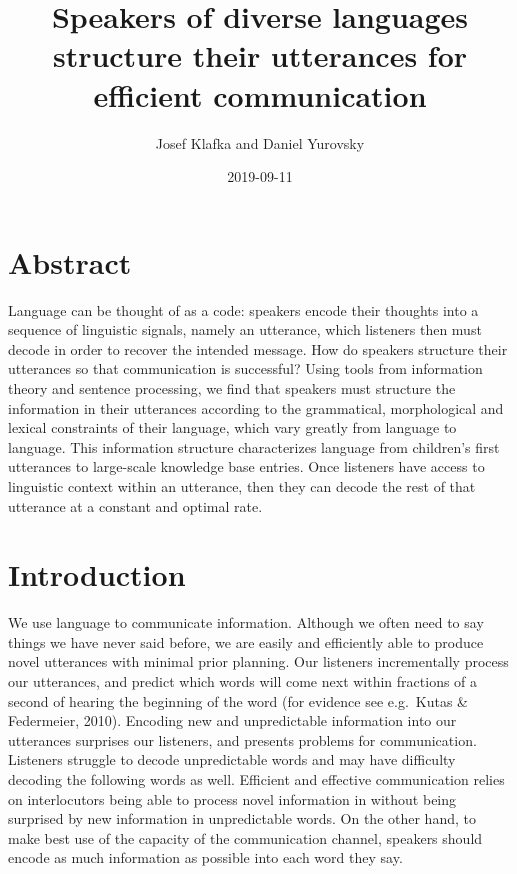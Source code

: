 \documentclass[11pt,]{article}
\title{Speakers of diverse languages structure their utterances for efficient communication}
\author{Josef Klafka and Daniel Yurovsky}
\date{2019-09-11}
\begin{document}
\maketitle

\hypertarget{abstract}{%
\section{Abstract}\label{abstract}}

Language can be thought of as a code: speakers encode their thoughts into a sequence of linguistic signals, namely an utterance, which listeners then must decode in order to recover the intended message. How do speakers structure their utterances so that communication is successful? Using tools from information theory and sentence processing, we find that speakers must structure the information in their utterances according to the grammatical, morphological and lexical constraints of their language, which vary greatly from language to language. This information structure characterizes language from children's first utterances to large-scale knowledge base entries. Once listeners have access to linguistic context within an utterance, then they can decode the rest of that utterance at a constant and optimal rate.

\hypertarget{introduction}{%
\section{Introduction}\label{introduction}}

We use language to communicate information. Although we often need to say things we have never said before, we are easily and efficiently able to produce novel utterances with minimal prior planning. Our listeners incrementally process our utterances, and predict which words will come next within fractions of a second of hearing the beginning of the word (for evidence see e.g.~Kutas \& Federmeier, 2010). Encoding new and unpredictable information into our utterances surprises our listeners, and presents problems for communication. Listeners struggle to decode unpredictable words and may have difficulty decoding the following words as well. Efficient and effective communication relies on interlocutors being able to process novel information in without being surprised by new information in unpredictable words. On the other hand, to make best use of the capacity of the communication channel, speakers should encode as much information as possible into each word they say.
\end{document}
